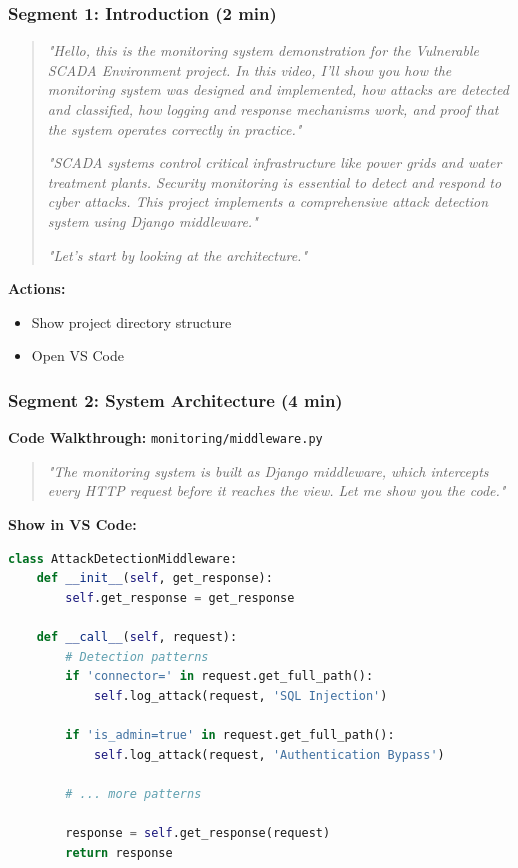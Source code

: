 \documentclass[12pt,a4paper]{article}
\begin{document}
\subsubsection{Segment 1: Introduction (2 min)}

\begin{quote}
\textit{"Hello, this is the monitoring system demonstration for the Vulnerable SCADA Environment project. In this video, I'll show you how the monitoring system was designed and implemented, how attacks are detected and classified, how logging and response mechanisms work, and proof that the system operates correctly in practice."}

\textit{"SCADA systems control critical infrastructure like power grids and water treatment plants. Security monitoring is essential to detect and respond to cyber attacks. This project implements a comprehensive attack detection system using Django middleware."}

\textit{"Let's start by looking at the architecture."}
\end{quote}

\textbf{Actions:}
\begin{itemize}
    \item Show project directory structure
    \item Open VS Code
\end{itemize}

\subsubsection{Segment 2: System Architecture (4 min)}

\textbf{Code Walkthrough:} \texttt{monitoring/middleware.py}

\begin{quote}
\textit{"The monitoring system is built as Django middleware, which intercepts every HTTP request before it reaches the view. Let me show you the code."}
\end{quote}

\textbf{Show in VS Code:}
\begin{lstlisting}[language=Python]
class AttackDetectionMiddleware:
    def __init__(self, get_response):
        self.get_response = get_response
    
    def __call__(self, request):
        # Detection patterns
        if 'connector=' in request.get_full_path():
            self.log_attack(request, 'SQL Injection')
        
        if 'is_admin=true' in request.get_full_path():
            self.log_attack(request, 'Authentication Bypass')
        
        # ... more patterns
        
        response = self.get_response(request)
        return response
\end{lstlisting}
\end{document}
